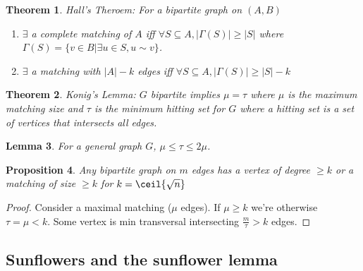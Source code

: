 \documentclass[a4paper]{article}
\newtheorem{thm}{Theorem}[section]
\newtheorem{lem}[thm]{Lemma}
\newtheorem{prop}[thm]{Proposition}
\begin{document}
\begin{thm}
    Hall's Theroem: For a bipartite graph on $(A,B)$ 
    \begin{enumerate}
        \item $\exists$ a complete matching of $A$ iff $\forall S\subseteq A, |\Gamma(S)|\geq |S|$ where $\Gamma(S)=\{v\in B| \exists u\in S, u\sim v\}$.
        \item $\exists$ a matching with $|A|-k$ edges iff $\forall S\subseteq A, |\Gamma(S)|\geq |S|-k$
    \end{enumerate}
\end{thm}
\begin{thm}
    Konig's Lemma: $G$ bipartite implies $\mu=\tau$ where $\mu$ is the maximum matching size and $\tau$ is the minimum hitting set for $G$ where a hitting set is a set of vertices that intersects all edges. 
\end{thm}
\begin{lem}
    For a general graph $G$, $\mu\leq \tau \leq 2\mu$. 
\end{lem}
\begin{prop}
    Any bipartite graph on $m$ edges has a vertex of degree $\geq k$ or a matching of size $\geq k$ for $k=\ceil{\sqrt{n}}$
\end{prop}
\begin{proof}
    Consider a maximal matching ($\mu$ edges). If $\mu\geq k$ we're otherwise $\tau=\mu<k$. Some vertex is min transversal intersecting $\frac{m}{\tau}>k$ edges. 
\end{proof}

\subsection{Sunflowers and the sunflower lemma}
\end{document}
